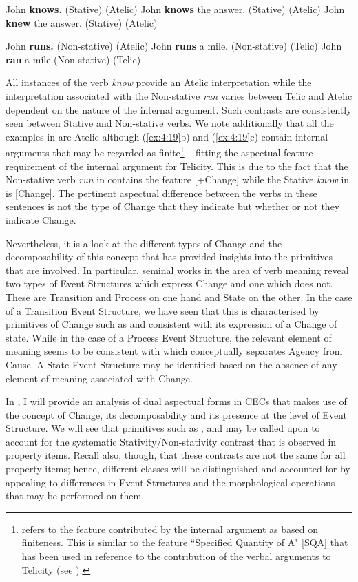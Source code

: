\ea%
\label{ex:4:19}
\ea John \textbf{knows.} (Stative) (Atelic) \ex John \textbf{knows} the
answer. (Stative) (Atelic) \ex John \textbf{knew} the answer. (Stative)
(Atelic) \z \z

\ea%
\label{ex:4:20}
\ea John \textbf{runs.} (Non-stative) (Atelic) 
\ex John \textbf{runs} a mile. (Non-stative) (Telic) 
\ex John \textbf{ran} a mile (Non-stative) (Telic) 
\z \z

All instances of the verb \textit{know} provide an Atelic interpretation
while the interpretation associated with the Non-stative \textit{run} varies
between Telic and Atelic dependent on the nature of the internal
argument.  Such contrasts are consistently seen between Stative and
Non-stative verbs.  We note additionally that all the examples in
 are Atelic although (\ref{ex:4:19}b) and (\ref{ex:4:19}c) contain internal arguments
that may be regarded as finite\footnote{\citet{Verkuyl1993} refers to
the feature contributed by the internal argument as based on
finiteness. This is similar to the feature ``Specified Quantity of A"
[SQA] that has been used in reference to the contribution of the
verbal arguments to Telicity (see  \citealt{Tenny1994,MacDonald2008}).} 
-- fitting the aspectual feature requirement of the internal argument for Telicity.  This is
due to the fact that the Non-stative verb \textit{run} in 
contains the feature [+Change] while the Stative \textit{know} in
 is [\textminus Change].  The pertinent aspectual difference
between the verbs in these sentences is not the type of Change that
they indicate but whether or not they indicate Change.

Nevertheless, it is a look at the different types of Change and the
decomposability of this concept that has provided insights into the
primitives that are involved.  In particular, seminal works in the
area of verb meaning reveal two types of Event Structures which
express Change and one which does not.  These are Transition and
Process on one hand and State on the other.  In the case of a
Transition Event Structure, we have seen that this is characterised by
primitives of Change such as \CAUSE and \BECOME consistent with its
expression of a Change of state. While in the case of a Process Event
Structure, the relevant element of meaning seems to be consistent with
\DO which conceptually separates Agency from Cause.  A State Event
Structure may be identified based on the absence of any element of
meaning associated with Change.

In , I will provide an analysis of dual aspectual forms in
CECs that makes use of the concept of Change, its decomposability and
its presence at the level of Event Structure.  We will see that
primitives such as \CAUSE, \BECOME and \DO may be called upon to account
for the systematic Stativity\slash Non-stativity contrast that is observed
in property items.  Recall also, though, that these contrasts are not
the same for all property items; hence, different classes will be
distinguished and accounted for by appealing to differences in Event
Structures and the morphological operations that may be performed on
them.

